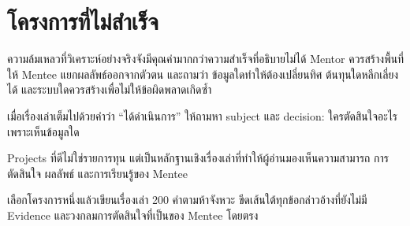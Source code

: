 \section{โครงการที่ไม่สำเร็จ}
ความล้มเหลวที่วิเคราะห์อย่างจริงจังมีคุณค่ามากกว่าความสำเร็จที่อธิบายไม่ได้ Mentor ควรสร้างพื้นที่ให้ Mentee แยกผลลัพธ์ออกจากตัวตน และถามว่า ข้อมูลใดทำให้ต้องเปลี่ยนทิศ ต้นทุนใดหลีกเลี่ยงได้ และระบบใดควรสร้างเพื่อไม่ให้ข้อผิดพลาดเกิดซ้ำ


\begin{mentornote}
เมื่อเรื่องเล่าเต็มไปด้วยคำว่า \enquote{ได้ดำเนินการ} ให้ถามหา subject และ decision: ใครตัดสินใจอะไร เพราะเห็นข้อมูลใด
\end{mentornote}

\begin{keytakeaway}
Projects ที่ดีไม่ใช่รายการทุน แต่เป็นหลักฐานเชิงเรื่องเล่าที่ทำให้ผู้อ่านมองเห็นความสามารถ การตัดสินใจ ผลลัพธ์ และการเรียนรู้ของ Mentee
\end{keytakeaway}

\begin{reflection}
เลือกโครงการหนึ่งแล้วเขียนเรื่องเล่า 200 คำตามห้าจังหวะ ขีดเส้นใต้ทุกข้อกล่าวอ้างที่ยังไม่มี Evidence และวงกลมการตัดสินใจที่เป็นของ Mentee โดยตรง
\blankline\blankline
\end{reflection}

